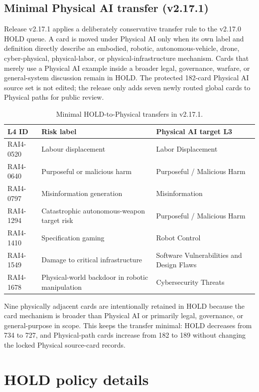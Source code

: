 \documentclass[11pt,a4paper]{article}
\begin{document}
\begin{appendices}
\subsection{Minimal Physical AI transfer (v2.17.1)}

Release v2.17.1 applies a deliberately conservative transfer rule to the
v2.17.0 HOLD queue. A card is moved under Physical AI only when its own label
and definition directly describe an embodied, robotic, autonomous-vehicle,
drone, cyber-physical, physical-labor, or physical-infrastructure mechanism.
Cards that merely use a Physical AI example inside a broader legal,
governance, warfare, or general-system discussion remain in HOLD. The protected
182-card Physical AI source set is not edited; the release only adds seven
newly routed global cards to Physical paths for public review.

\begin{table}[ht]
\centering
\caption{Minimal HOLD-to-Physical transfers in v2.17.1.}
\label{tab:v2171-minimal-physical-transfer}
\small
\begin{tabularx}{\textwidth}{@{}l Y L{4.6cm}@{}}
\toprule
L4 ID & Risk label & Physical AI target L3 \\
\midrule
RAI4-0520 & Labour displacement & Labor Displacement \\
RAI4-0640 & Purposeful or malicious harm & Purposeful / Malicious Harm \\
RAI4-0797 & Misinformation generation & Misinformation \\
RAI4-1294 & Catastrophic autonomous-weapon target risk & Purposeful / Malicious Harm \\
RAI4-1410 & Specification gaming & Robot Control \\
RAI4-1549 & Damage to critical infrastructure & Software Vulnerabilities and Design Flaws \\
RAI4-1678 & Physical-world backdoor in robotic manipulation & Cybersecurity Threats \\
\bottomrule
\end{tabularx}
\end{table}

Nine physically adjacent cards are intentionally retained in HOLD because the
card mechanism is broader than Physical AI or primarily legal, governance, or
general-purpose in scope. This keeps the transfer minimal: HOLD decreases from
734 to 727, and Physical-path cards increase from 182 to 189 without changing
the locked Physical source-card records.

\section{HOLD policy details}
\label{app:holdpolicy}


\end{appendices}
\end{document}
